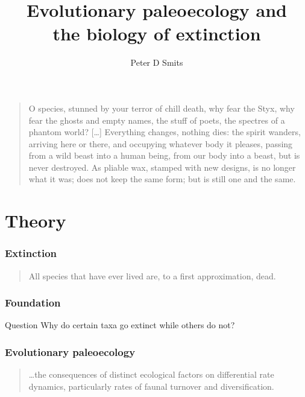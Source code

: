 \documentclass{beamer}
\title{Evolutionary paleoecology and \\the biology of extinction}
\author{Peter D Smits}
\institute{Committee on Evolutionary Biology, University of Chicago}
\begin{document}
\begin{frame}
  \begin{quotation}
    O species, stunned by your terror of chill death, why fear the Styx, why
    fear the ghosts and empty names, the stuff of poets, the spectres of a
    phantom world? [\dots] Everything changes, nothing dies: the spirit
    wanders, arriving here or there, and occupying whatever body it pleases,
    passing from a wild beast into a human being, from our body into a
    beast, but is never destroyed. As pliable wax, stamped with new designs,
    is no longer what it was; does not keep the same form; but is still one
    and the same.

  \end{quotation}
\end{frame}

\begin{frame}
  \maketitle
\end{frame}

\begin{frame}
  \tableofcontents
\end{frame}


\section{Theory}

\begin{frame}
  \frametitle{Extinction}

  \begin{quotation}
    All species that have ever lived are, to a first approximation, dead.

    \tiny{}
  \end{quotation}
\end{frame}

\begin{frame}
  \frametitle{Foundation}

  \begin{alertblock}{Question}
    Why do certain taxa go extinct while others do not?
  \end{alertblock}
\end{frame}

\begin{frame}
  \frametitle{Evolutionary paleoecology}
  \begin{quotation}
    \dots the consequences of distinct ecological factors on differential rate dynamics, particularly rates of faunal turnover and diversification.

    \tiny{}
  \end{quotation}
\end{frame}
\end{document}

